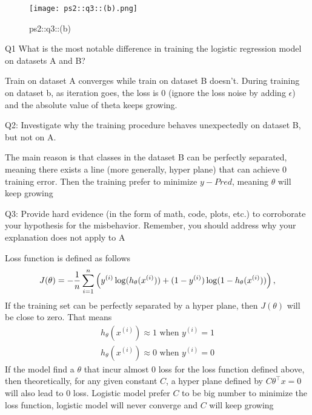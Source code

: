 \begin{answer}
\begin{figure}[H]
    \centering
    \texttt{[image: ps2::q3::(b).png]}
    \caption{ps2::q3::(b)}
    \label{fig:enter-label}
\end{figure}

Q1 What is the most notable difference in training the logistic regression
model on datasets A and B? 

Train on dataset A converges while train on dataset B doesn't. During training on dataset b, as iteration goes, the loss is 0 (ignore the loss noise by adding $\epsilon$) and the absolute value of theta keeps growing. \\
\newline

Q2: Investigate why the training procedure behaves unexpectedly on dataset B, but not on A. 

The main reason is that classes in the dataset B can be perfectly separated, meaning there exists a line (more generally, hyper plane) that can achieve 0 training error. Then the training prefer to minimize $y - Pred$, meaning $\theta$ will keep growing \\
\newline

Q3: Provide hard evidence (in the form of math, code, plots, etc.)
to corroborate your hypothesis for the misbehavior. Remember, you should address why
your explanation does not apply to A

Loss function is defined as follows
\begin{equation*}
	J(\theta)
	= -\frac{1}{{n}} \sum_{i=1}^{n} \left(y^{(i)}\log(h_{\theta}(x^{(i)}))
		+  (1 - y^{(i)})\log(1 - h_{\theta}(x^{(i)}))\right),
\end{equation*}
If the training set can be perfectly separated by a hyper plane, then $J(\theta)$ will be close to zero. That means 
\begin{align}
    h_{\theta}(x^{(i)}) \approx 1 \text{ when } y^{(i)} = 1 \\
    h_{\theta}(x^{(i)}) \approx 0 \text{ when } y^{(i)} = 0 
\end{align}
If the model find a $\theta$ that incur almost 0 loss for the loss function defined above, then theoretically, for any given constant $C$, a hyper plane defined by $C \theta^\top x = 0$ will also lead to 0 loss. Logistic model prefer $C$ to be big number to minimize the loss function, logistic model will never converge and $C$ will keep growing


\end{answer}
